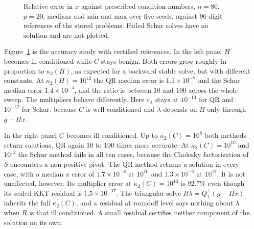 \documentclass[10pt]{article}
\newcommand{\kap}{\kappa_2}
\newcommand{\plotqr}[1]{%
  \addplot+[color=QRBlue,mark=*,mark size=1.7pt,line width=.9pt,
  error bars/y dir=both,error bars/y explicit,error bars/error bar style={line width=.5pt}]
  table[x=x,y=y,y error plus=plus,y error minus=minus,col sep=comma]{data/#1};}
\newcommand{\plotschur}[1]{%
  \addplot+[color=SchurOrange,mark=square*,mark size=1.6pt,line width=.9pt,
  error bars/y dir=both,error bars/y explicit,error bars/error bar style={line width=.5pt}]
  table[x=x,y=y,y error plus=plus,y error minus=minus,col sep=comma]{data/#1};}
\begin{document}
\begin{figure}[t]
\centering
{}
\hfill
{}
\caption{Relative error in $x$ against prescribed condition numbers, $n=80$, $p=20$,
medians and min and max over five seeds, against 96-digit references of the stored problems.
Failed Schur solves have no solution and are not plotted.}
\label{fig:cond}
\end{figure}

Figure~\ref{fig:cond} is the accuracy study with certified references. In the left panel
$H$ becomes ill conditioned while $C$ stays benign. Both errors grow roughly in proportion
to $\kap(H)$, as expected for a backward stable solve, but with different constants. At
$\kap(H)=10^{12}$ the QR median error is $1.1\times10^{-7}$ and the Schur median error
$1.4\times10^{-4}$, and the ratio is between 10 and 100 across the whole sweep. The
multipliers behave differently. Here $e_\lambda$ stays at $10^{-14}$ for QR and
$10^{-12}$ for Schur, because $C$ is well conditioned and $\lambda$ depends on $H$ only
through $g-Hx$.

In the right panel $C$ becomes ill conditioned. Up to $\kap(C)=10^8$ both methods return
solutions, QR again 10 to 100 times more accurate. At $\kap(C)=10^{10}$ and $10^{12}$ the
Schur method fails in all ten cases, because the Cholesky factorization of $S$ encounters
a non positive pivot. The QR method returns a solution in every case, with a median $x$
error of $1.7\times10^{-8}$ at $10^{10}$ and $1.3\times10^{-6}$ at $10^{12}$. It is not
unaffected, however. Its multiplier error at $\kap(C)=10^{10}$ is $92.7\%$ even though
its scaled KKT residual is $1.5\times10^{-17}$. The triangular solve $R\lambda=Q_1^\top(g-Hx)$
inherits the full $\kap(C)$, and a residual at roundoff level says nothing about
$\lambda$ when $R$ is that ill conditioned. A small residual certifies neither component
of the solution on its own.
\end{document}
